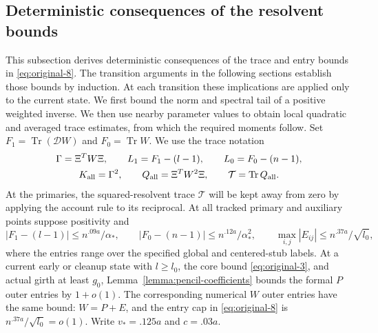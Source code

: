 \subsection{Deterministic consequences of the resolvent bounds}
\label{subsec:resolvent-consequences}

This subsection derives deterministic consequences of the trace and entry
bounds in \eqref{eq:original-8}. The transition arguments in the following
sections establish those bounds by induction. At each transition these
implications are applied only to the current state. We first bound the
norm and spectral tail of a positive weighted inverse. We then use
nearby parameter values to obtain local quadratic and averaged trace
estimates, from which the required moments follow. Set
$F_1=\operatorname{Tr}(\mathcal DW)$ and $F_0=\operatorname{Tr}W$.
We use the trace notation
\[
 \begin{gathered}
 \Gamma=\Xi^TW\Xi,\qquad L_1=F_1-(l-1),\qquad L_0=F_0-(n-1),\\
 K_{\rm all}=\Gamma^2,\qquad Q_{\rm all}=\Xi^TW^2\Xi,\qquad
 \mathcal T=\operatorname{Tr}Q_{\rm all}.
 \end{gathered}
\]
At the primaries, the squared-resolvent trace $\mathcal T$ will be kept
away from zero by applying the account rule to its reciprocal.
At all tracked primary and auxiliary points suppose positivity and
\begin{equation}
 |F_1-(l-1)|\le n^{.09a}/\alpha_*,\qquad
 |F_0-(n-1)|\le n^{.12a}/\alpha_*^2,\qquad
 \max_{i,j}|E_{ij}|\le n^{.37a}/\sqrt{l_0},
 \label{eq:original-8}
\end{equation}
where the entries range over the specified global and centered-stub
labels. At a current early or cleanup state with $l\ge l_0$, the core
bound \eqref{eq:original-3}, and actual girth at least $g_0$,
Lemma~\ref{lemma:pencil-coefficients} bounds the formal $P$ outer entries
by $1+o(1)$. The corresponding numerical $W$ outer entries have the
same bound: $W=P+E$, and the entry cap in \eqref{eq:original-8} is
$n^{.37a}/\sqrt{l_0}=o(1)$. Write $v_*=.125a$ and $c=.03a$.


